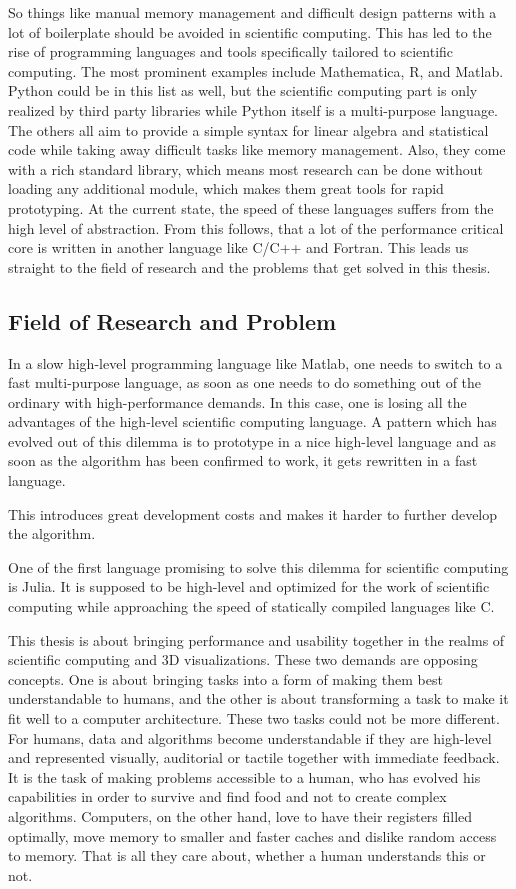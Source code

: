 So things like manual memory management and difficult design patterns with a lot of boilerplate should be avoided in scientific computing.
This has led to the rise of programming languages and tools specifically tailored to scientific computing.
The most prominent examples include Mathematica, R, and Matlab. Python could be in this list as well, but the scientific computing part is only realized by third party libraries while Python itself is a multi-purpose language.
The others all aim to provide a simple syntax for linear algebra and statistical code while taking away difficult tasks like memory management. 
Also, they come with a rich standard library, which means most research can be done without loading any additional module, which makes them great tools for rapid prototyping.
At the current state, the speed of these languages suffers from the high level of abstraction. 
From this follows, that a lot of the performance critical core is written in another language like C/C++ and Fortran. 
This leads us straight to the field of research and the problems that get solved in this thesis.



\subsection{Field of Research and Problem}


In a slow high-level programming language like Matlab, one needs to switch to a fast multi-purpose language, as soon as one needs to do something out of the ordinary with high-performance demands.
In this case, one is losing all the advantages of the high-level scientific computing language.
A pattern which has evolved out of this dilemma is to prototype in a nice high-level language and as soon as the algorithm has been confirmed to work, it gets rewritten in a fast language.

This introduces great development costs and makes it harder to further develop the algorithm.

One of the first language promising to solve this dilemma for scientific computing is Julia. 
It is supposed to be high-level and optimized for the work of scientific computing while approaching the speed of statically compiled languages like C.

This thesis is about bringing performance and usability together in the realms of scientific computing and 3D visualizations.
These two demands are opposing concepts. 
One is about bringing tasks into a form of making them best understandable to humans, and the other is about transforming a task to make it fit well to a computer architecture.
These two tasks could not be more different. 
For humans, data and algorithms become understandable if they are high-level and represented visually, auditorial or tactile together with immediate feedback. 
It is the task of making problems accessible to a human, who has evolved his capabilities in order to survive and find food and not to create complex algorithms.
Computers, on the other hand, love to have their registers filled optimally, move memory to smaller and faster caches and dislike random access to memory. That is all they care about, whether a human understands this or not.

